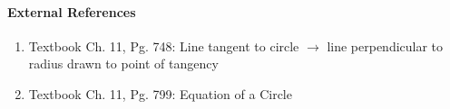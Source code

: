 \documentclass[letterpaper,12pt,twoside]{report}
\begin{document}
	\paragraph{External References}
	
	\begin{enumerate}
		\item Textbook Ch. 11, Pg. 748: Line tangent to circle $\rightarrow$ line perpendicular to radius drawn to point of tangency
		\item Textbook Ch. 11, Pg. 799: Equation of a Circle
	\end{enumerate}
	
\end{document}
